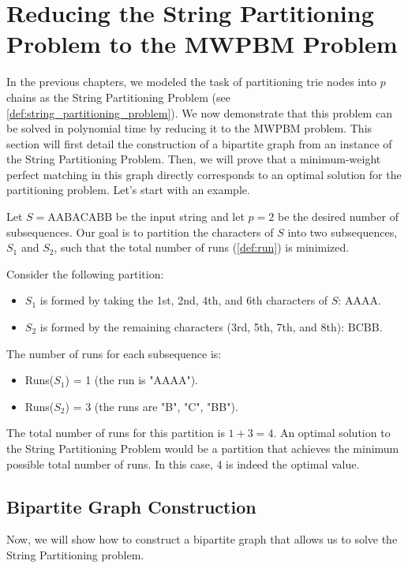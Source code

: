 \section{Reducing the String Partitioning Problem to the MWPBM Problem}
\label{sec:reduction_to_mwpbm}

In the previous chapters, we modeled the task of partitioning trie nodes into $p$ chains as the String Partitioning Problem (see \cref{def:string_partitioning_problem}). We now demonstrate that this problem can be solved in polynomial time by reducing it to the MWPBM problem. This section will first detail the construction of a bipartite graph from an instance of the String Partitioning Problem. Then, we will prove that a minimum-weight perfect matching in this graph directly corresponds to an optimal solution for the partitioning problem. Let's start with an example.

\begin{example}
    \label{ex:string_partitioning}
    Let $S = \text{AABACABB}$ be the input string and let $p=2$ be the desired number of subsequences. Our goal is to partition the characters of $S$ into two subsequences, $S_1$ and $S_2$, such that the total number of runs (\cref{def:run}) is minimized.

    Consider the following partition:
    \begin{itemize}
        \item $S_1$ is formed by taking the 1st, 2nd, 4th, and 6th characters of $S$: $\text{AAAA}$.
        \item $S_2$ is formed by the remaining characters (3rd, 5th, 7th, and 8th): $\text{BCBB}$.
    \end{itemize}
    
    The number of runs for each subsequence is:
    \begin{itemize}
        \item Runs($S_1$) = 1 (the run is "AAAA").
        \item Runs($S_2$) = 3 (the runs are "B", "C", "BB").
    \end{itemize}
    
    The total number of runs for this partition is $1 + 3 = 4$. An optimal solution to the String Partitioning Problem would be a partition that achieves the minimum possible total number of runs. In this case, 4 is indeed the optimal value.
\end{example}

\subsection{Bipartite Graph Construction}
Now, we will show how to construct a bipartite graph that allows us to solve the
String Partitioning problem.

